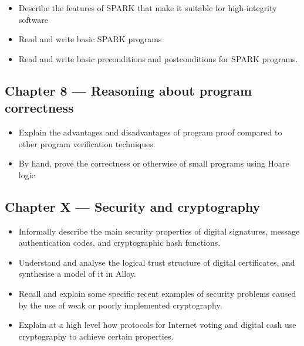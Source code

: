 \documentclass[a4paper,11pt]{article}
\begin{document}
\begin{itemize}
  \item Describe the features of SPARK that make it suitable for high-integrity software
 \item Read and write basic SPARK programs
 \item Read and write basic preconditions and postconditions for SPARK programs.
\end{itemize}

\subsection*{Chapter 8 --- Reasoning about program correctness}

\begin{itemize}
 \item Explain the advantages and disadvantages of program proof compared to other program verification techniques.
 \item By hand, prove the correctness or otherwise of small programs using  Hoare logic 
\end{itemize}


\subsection*{Chapter X --- Security and cryptography}

\begin{itemize}

 \item Informally describe  the main security properties of digital signatures,  message authentication codes, and cryptographic hash functions.
 \item  Understand and analyse the logical trust structure of digital certificates, and synthesise a model of it in Alloy.
 \item  Recall and explain some specific recent examples of security problems caused by the use of weak or poorly implemented cryptography.
 \item Explain at a high level how protocols for Internet voting and digital cash use cryptography to achieve certain properties.

\end{itemize}
\end{document}

